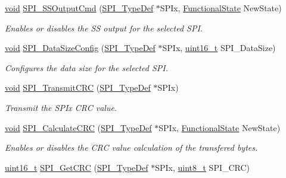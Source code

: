 \begin{DoxyCompactItemize}
\hyperlink{group___n_a_m_e_ga18028b8badbf1ea7e704ccac3c488e82}{void} \hyperlink{group___s_p_i___private___functions_ga4ec54abdedf6cd17403d853a926d91c1}{S\-P\-I\-\_\-\-S\-S\-Output\-Cmd} (\hyperlink{struct_s_p_i___type_def}{S\-P\-I\-\_\-\-Type\-Def} $\ast$S\-P\-Ix, \hyperlink{group___exported__types_gac9a7e9a35d2513ec15c3b537aaa4fba1}{Functional\-State} New\-State)
\begin{DoxyCompactList}\small\item\em Enables or disables the S\-S output for the selected S\-P\-I. \end{DoxyCompactList}\item 
\hyperlink{group___n_a_m_e_ga18028b8badbf1ea7e704ccac3c488e82}{void} \hyperlink{group___s_p_i___private___functions_gafc82e90841d7879535d655c035709cb1}{S\-P\-I\-\_\-\-Data\-Size\-Config} (\hyperlink{struct_s_p_i___type_def}{S\-P\-I\-\_\-\-Type\-Def} $\ast$S\-P\-Ix, \hyperlink{stdint_8h_a273cf69d639a59973b6019625df33e30}{uint16\-\_\-t} S\-P\-I\-\_\-\-Data\-Size)
\begin{DoxyCompactList}\small\item\em Configures the data size for the selected S\-P\-I. \end{DoxyCompactList}\item 
\hyperlink{group___n_a_m_e_ga18028b8badbf1ea7e704ccac3c488e82}{void} \hyperlink{group___s_p_i___private___functions_gace8b1058e09bab150b0dbe5978810273}{S\-P\-I\-\_\-\-Transmit\-C\-R\-C} (\hyperlink{struct_s_p_i___type_def}{S\-P\-I\-\_\-\-Type\-Def} $\ast$S\-P\-Ix)
\begin{DoxyCompactList}\small\item\em Transmit the S\-P\-Ix C\-R\-C value. \end{DoxyCompactList}\item 
\hyperlink{group___n_a_m_e_ga18028b8badbf1ea7e704ccac3c488e82}{void} \hyperlink{group___s_p_i___private___functions_ga64f7276d119e6cb58afc100f8832adb0}{S\-P\-I\-\_\-\-Calculate\-C\-R\-C} (\hyperlink{struct_s_p_i___type_def}{S\-P\-I\-\_\-\-Type\-Def} $\ast$S\-P\-Ix, \hyperlink{group___exported__types_gac9a7e9a35d2513ec15c3b537aaa4fba1}{Functional\-State} New\-State)
\begin{DoxyCompactList}\small\item\em Enables or disables the C\-R\-C value calculation of the transfered bytes. \end{DoxyCompactList}\item 
\hyperlink{stdint_8h_a273cf69d639a59973b6019625df33e30}{uint16\-\_\-t} \hyperlink{group___s_p_i___private___functions_ga4c81c193516e82cf0a2fdc149ef20cc6}{S\-P\-I\-\_\-\-Get\-C\-R\-C} (\hyperlink{struct_s_p_i___type_def}{S\-P\-I\-\_\-\-Type\-Def} $\ast$S\-P\-Ix, \hyperlink{stdint_8h_aba7bc1797add20fe3efdf37ced1182c5}{uint8\-\_\-t} S\-P\-I\-\_\-\-C\-R\-C)

\end{DoxyCompactItemize}
